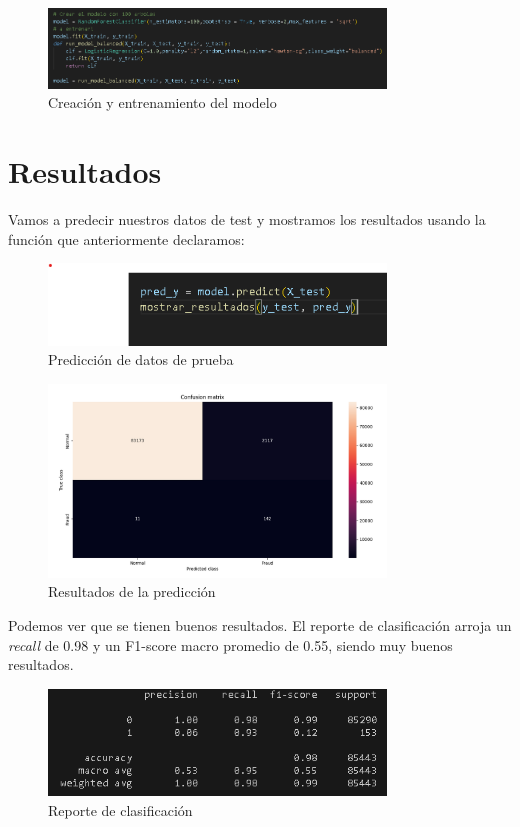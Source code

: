 \documentclass{article}
\begin{document}
\begin{figure}[H]
    \centering
    \includegraphics[width=0.8\textwidth]{img/6.png}
    \caption{Creación y entrenamiento del modelo}
\end{figure}

\section{Resultados}
Vamos a predecir nuestros datos de test y mostramos los resultados usando la función que anteriormente declaramos:

\begin{figure}[H]
    \centering
    \includegraphics[width=0.8\textwidth]{img/7.png}
    \caption{Predicción de datos de prueba}
\end{figure}

\begin{figure}[H]
    \centering
    \includegraphics[width=0.8\textwidth]{img/8.png}
    \caption{Resultados de la predicción}
\end{figure}

Podemos ver que se tienen buenos resultados. El reporte de clasificación arroja un \textit{recall} de 0.98 y un F1-score macro promedio de 0.55, siendo muy buenos resultados.

\begin{figure}[H]
    \centering
    \includegraphics[width=0.8\textwidth]{img/9.png}
    \caption{Reporte de clasificación}
\end{figure}
\end{document}
